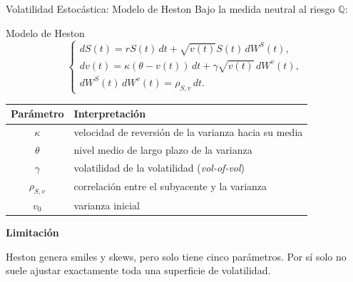 \documentclass[8pt]{beamer}
\begin{document}
\begin{frame}{Volatilidad Estocástica: Modelo de Heston}
    Bajo la medida neutral al riesgo $\mathbb{Q}$:
    \begin{block}{Modelo de Heston}
    \[
    \begin{cases}
    dS(t) = rS(t)\,dt+\sqrt{v(t)}S(t)\,dW^{S}(t), \\[0.15cm]
    dv(t) = \kappa(\theta-v(t))\,dt+\gamma\sqrt{v(t)}\,dW^{v}(t),\\[0.15cm]
    dW^{S}(t)\,dW^{v}(t)=\rho_{S,v}\,dt.
    \end{cases}
    \]
    \end{block}
    \pause

    \begin{table}
    \centering
    \scriptsize
    \begin{tabular}{c|p{7cm}}
    \hline
    \textbf{Parámetro} & \textbf{Interpretación} \\
    \hline
    $\kappa$ & velocidad de reversión de la varianza hacia su media \\
    $\theta$ & nivel medio de largo plazo de la varianza \\
    $\gamma$ & volatilidad de la volatilidad (\textit{vol-of-vol}) \\
    $\rho_{S,v}$ & correlación entre el subyacente y la varianza \\
    $v_0$ & varianza inicial \\
    \hline
    \end{tabular}
    \end{table}
    \pause

    \textbf{Limitación}

Heston genera smiles y skews, pero solo tiene cinco parámetros. Por sí solo no suele ajustar exactamente toda una superficie de volatilidad.

\end{frame}
\end{document}
